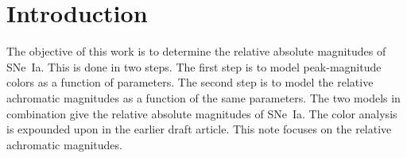 \documentclass{aastex61}   	%
\begin{document}
% 
%    
%    
%     
% 
% 
%
%
%
%
%   
%    


%

\section{Introduction}
The objective of this work is to determine the relative absolute magnitudes of SNe~Ia.  This is done in two steps.
The first step is to model peak-magnitude colors as a function of parameters.  The second step is to model the relative achromatic magnitudes
as a function of the same parameters.
The two models in combination give the  relative absolute magnitudes of SNe~Ia.
The color analysis is expounded upon in the earlier draft article.  This note focuses on the relative achromatic magnitudes.
\end{document}
